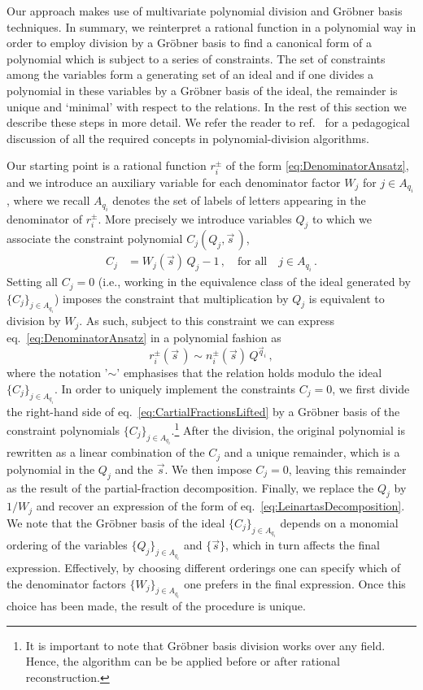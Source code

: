 Our approach makes use of multivariate polynomial division and
Gröbner basis techniques. In summary, we reinterpret a rational
function in a polynomial way in order to employ division by a Gröbner basis
to find a canonical form of a
polynomial which is subject to a series of constraints. The set of
constraints among the variables form a generating set of an ideal and
if one divides a polynomial in these variables by a Gröbner basis of
the ideal, the remainder is unique and `minimal' with respect to the
relations. In the rest of this section we describe these steps in more
detail. We refer the reader to ref.~\cite{cox2013ideals} for a pedagogical
discussion of all the required concepts in polynomial-division algorithms.

Our starting point is a rational function $r_i^\pm$ 
of the form \eqref{eq:DenominatorAnsatz}, and 
we introduce an auxiliary variable for each
denominator factor $W_j$ for $j\in A_{q_i}$, where we recall $A_{q_i}$ denotes
the set of labels of letters appearing in the denominator of $r_i^\pm$.
More precisely we introduce variables $Q_j$ to which we
associate the constraint polynomial $C_j(Q_j, \vec s\,)$,
\begin{align}
    C_j &= W_j (\vec s) \, Q_j - 1\,, 
	\quad\mbox{for all}\quad  j \in  A_{q_i}\,.
   \label{eq:PartialFractionConstraints}
\end{align}
Setting all $C_j = 0$ (i.e., working in the equivalence class of the ideal 
generated by $\{ C_j \}_{j \in A_{q_i}}$)
imposes the constraint that multiplication by $Q_j$
is equivalent to division by $W_j$. 
As such, subject to this constraint we can
express eq.~\eqref{eq:DenominatorAnsatz} in a polynomial fashion as
\begin{equation}
    r_i^{\pm}(\vec{s}\,) \sim n_i^{\pm}(\vec s)\, Q^{\vec q_{i}}\,,
    \label{eq:CartialFractionsLifted}
\end{equation}
where the notation '$\sim$' emphasises that the relation holds modulo 
the ideal $\{ C_j \}_{j \in A_{q_i}}$.
In order to uniquely implement the constraints $C_j = 0$, we first divide
the right-hand side of eq.~\eqref{eq:CartialFractionsLifted} by a
Gröbner basis of the constraint polynomials 
$\{ C_j \}_{j \in A_{q_i}}$.\footnote{It is important to note that Gröbner 
basis division works over any
field. Hence, the algorithm can be be applied before or after rational reconstruction.}
After the division, the original polynomial is rewritten as a linear combination 
of the $C_j$ and a unique remainder, which is a polynomial in the $Q_j$ and the $\vec s$.
We then impose
$C_j=0$, leaving this remainder as the result of the 
partial-fraction decomposition. Finally, 
we replace the $Q_j$ by $1/W_j$ and recover an expression of the form 
of eq.~\eqref{eq:LeinartasDecomposition}. We note that
the Gröbner basis of the ideal $\{ C_j \}_{j \in A_{q_i}}$ depends on a 
monomial ordering of the variables $\{ Q_j \}_{j \in A_{q_i}}$ and $\{\vec s\}$, 
which in turn affects the final expression. Effectively, by choosing different
orderings one can specify which 
of the denominator factors $\{ W_j \}_{j \in A_{q_{i}}}$ one 
prefers in the final expression. Once this choice has been made,
the result of the procedure is unique.

